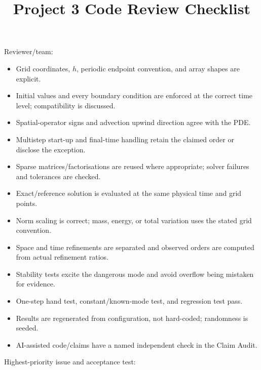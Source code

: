 \documentclass[11pt]{article}\usepackage[a4paper,margin=2cm]{geometry}\usepackage{enumitem,amssymb}
\title{Project 3 Code Review Checklist}\author{}\date{}
\begin{document}
\maketitle
Reviewer/team: \hrulefill
\begin{itemize}[leftmargin=*]
\item[$\square$] Grid coordinates, $h$, periodic endpoint convention, and array shapes are explicit.
\item[$\square$] Initial values and every boundary condition are enforced at the correct time level; compatibility is discussed.
\item[$\square$] Spatial-operator signs and advection upwind direction agree with the PDE.
\item[$\square$] Multistep start-up and final-time handling retain the claimed order or disclose the exception.
\item[$\square$] Sparse matrices/factorisations are reused where appropriate; solver failures and tolerances are checked.
\item[$\square$] Exact/reference solution is evaluated at the same physical time and grid points.
\item[$\square$] Norm scaling is correct; mass, energy, or total variation uses the stated grid convention.
\item[$\square$] Space and time refinements are separated and observed orders are computed from actual refinement ratios.
\item[$\square$] Stability tests excite the dangerous mode and avoid overflow being mistaken for evidence.
\item[$\square$] One-step hand test, constant/known-mode test, and regression test pass.
\item[$\square$] Results are regenerated from configuration, not hard-coded; randomness is seeded.
\item[$\square$] AI-assisted code/claims have a named independent check in the Claim Audit.
\end{itemize}
Highest-priority issue and acceptance test: \vspace{2cm}
\end{document}
